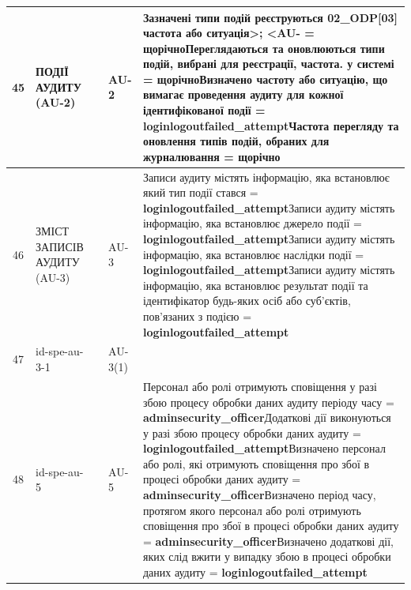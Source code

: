 \documentclass[10pt]{article}
\begin{document}
\begin{longtable}{|c|>{\raggedright\arraybackslash}p{4cm}|>{\raggedright\arraybackslash}p{2.5cm}|>{\raggedright\arraybackslash}p{3.5cm}|>{\raggedright\arraybackslash}p{5.5cm}|}
45 & ПОДІЇ АУДИТУ (AU-2) &  & AU-2 & Зазначені типи подій реєструються 02\_\allowbreak{}ODP[03] частота або ситуація>; <AU- = \textbf{щорічно}\newline Переглядаються та оновлюються типи подій, вибрані для реєстрації, частота. у системі = \textbf{щорічно}\newline Визначено частоту або ситуацію, що вимагає проведення аудиту для кожної ідентифікованої події = \textbf{loginlogoutfailed\_\allowbreak{}attempt}\newline Частота перегляду та оновлення типів подій, обраних для журналювання = \textbf{щорічно} \\ \hline
46 & ЗМІСТ ЗАПИСІВ АУДИТУ (AU-3) &  & AU-3 & Записи аудиту містять інформацію, яка встановлює який тип події стався = \textbf{loginlogoutfailed\_\allowbreak{}attempt}\newline Записи аудиту містять інформацію, яка встановлює джерело події = \textbf{loginlogoutfailed\_\allowbreak{}attempt}\newline Записи аудиту містять інформацію, яка встановлює наслідки події = \textbf{loginlogoutfailed\_\allowbreak{}attempt}\newline Записи аудиту містять інформацію, яка встановлює результат події та ідентифікатор будь-яких осіб або суб'єктів, пов'язаних з подією = \textbf{loginlogoutfailed\_\allowbreak{}attempt} \\ \hline
47 & id-spe-au-3-1 &  & AU-3(1) &  \\ \hline
48 & id-spe-au-5 &  & AU-5 & Персонал або ролі отримують сповіщення у разі збою процесу обробки даних аудиту періоду часу = \textbf{adminsecurity\_\allowbreak{}officer}\newline Додаткові дії виконуються у разі збою процесу обробки даних аудиту = \textbf{loginlogoutfailed\_\allowbreak{}attempt}\newline Визначено персонал або ролі, які отримують сповіщення про збої в процесі обробки даних аудиту  = \textbf{adminsecurity\_\allowbreak{}officer}\newline Визначено період часу, протягом якого персонал або ролі отримують сповіщення про збої в процесі обробки даних аудиту = \textbf{adminsecurity\_\allowbreak{}officer}\newline Визначено додаткові дії, яких слід вжити у випадку збою в процесі обробки даних аудиту  = \textbf{loginlogoutfailed\_\allowbreak{}attempt} \\ \hline

\end{longtable}
\end{document}
